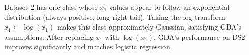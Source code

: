 \begin{answer}
Dataset 2 has one class whose $x_1$ values appear to follow an exponential distribution (always positive, long right tail). Taking the log transform $x_1 \leftarrow \log(x_1)$ makes this class approximately Gaussian, satisfying GDA's assumptions. After replacing $x_1$ with $\log(x_1)$, GDA's performance on DS2 improves significantly and matches logistic regression.
\end{answer}
